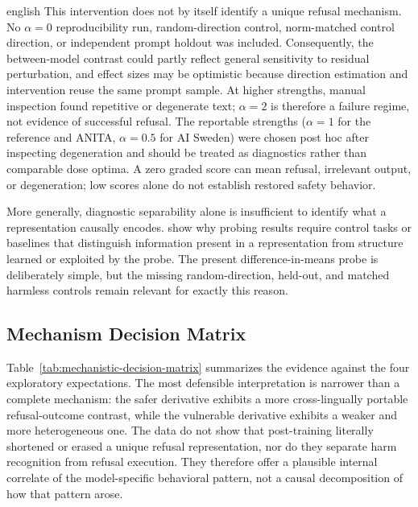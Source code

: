 \begin{otherlanguage*}{english}
This intervention does not by itself identify a unique refusal mechanism. No $\alpha=0$ reproducibility run, random-direction control, norm-matched control direction, or independent prompt holdout was included. Consequently, the between-model contrast could partly reflect general sensitivity to residual perturbation, and effect sizes may be optimistic because direction estimation and intervention reuse the same prompt sample. At higher strengths, manual inspection found repetitive or degenerate text; $\alpha=2$ is therefore a failure regime, not evidence of successful refusal. The reportable strengths ($\alpha=1$ for the reference and ANITA, $\alpha=0.5$ for AI Sweden) were chosen post hoc after inspecting degeneration and should be treated as diagnostics rather than comparable dose optima. A zero graded score can mean refusal, irrelevant output, or degeneration; low scores alone do not establish restored safety behavior.

More generally, diagnostic separability alone is insufficient to identify what a representation causally encodes. \textcite{hewittDesigningInterpretingProbes2019} show why probing results require control tasks or baselines that distinguish information present in a representation from structure learned or exploited by the probe. The present difference-in-means probe is deliberately simple, but the missing random-direction, held-out, and matched harmless controls remain relevant for exactly this reason.

\subsection{Mechanism Decision Matrix}
\label{sec:mechanism-decision-matrix}

Table~\ref{tab:mechanistic-decision-matrix} summarizes the evidence against the four exploratory expectations. The most defensible interpretation is narrower than a complete mechanism: the safer derivative exhibits a more cross-lingually portable refusal-outcome contrast, while the vulnerable derivative exhibits a weaker and more heterogeneous one. The data do not show that post-training literally shortened or erased a unique refusal representation, nor do they separate harm recognition from refusal execution. They therefore offer a plausible internal correlate of the model-specific behavioral pattern, not a causal decomposition of how that pattern arose.


\end{otherlanguage*}
